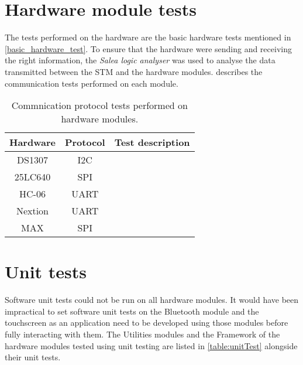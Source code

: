 \section{Hardware module tests}
The tests performed on the hardware are the basic hardware tests mentioned in \ref{basic_hardware_test}.
To ensure that the hardware were sending and receiving the right information, the \textit{Salea logic analyser} was used to analyse the data transmitted between the STM and the hardware modules. describes the communication tests performed on each module.

\begin{table}[h!]
	\centering
	\caption{Commnication protocol tests performed on hardware modules.}
	\label{table:coms_test}
	\begin{tabular}{ccp{25em}}
		\hline
		\hline
		\toprule
		\textbf{Hardware} & \textbf{Protocol} & \textbf{Test description}\\
		\hline
		\hline
		\toprule
		DS1307 & I2C & \\ 
		\midrule
		25LC640 & SPI & \\ 
		\midrule
		HC-06 & UART & \\ 
		\midrule
		Nextion & UART & \\ 
		\midrule
		MAX & SPI & \\
		\hline
		\hline
	\end{tabular}
\end{table}



\section{Unit tests}

Software unit tests could not be run on all hardware modules. It would have been impractical to set software unit tests on the Bluetooth module and the touchscreen as an application need to be developed using those modules before fully interacting with them. The Utilities modules and the Framework of the hardware modules tested using unit testing are listed in \cref{table:unitTest} alongside their unit tests.

